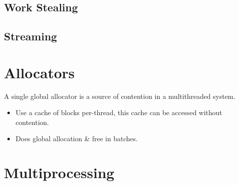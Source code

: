 \subsection{Work Stealing}
\subsection{Streaming}

\section{Allocators}
A single global allocator is a source of contention in a multithreaded system.
\begin{itemize}
    \item Use a cache of blocks per-thread, this cache can be accessed without contention.
    \item Does global allocation \& free in batches. 
\end{itemize}

\section{Multiprocessing}
\unfinished

